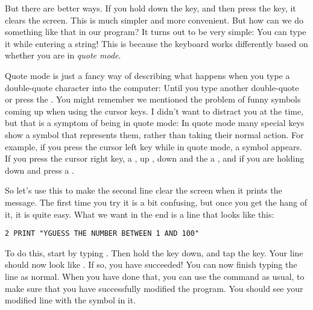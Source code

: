 But there are better ways.  If you hold down the 
key, and then press the  key, it clears the
screen.  This is much simpler and more convenient. But how can we do
something like that in our program?  It turns out to be very simple:
You can type it while entering a string!  This is because the keyboard
works differently based on whether you are in {\em quote
  mode}.

Quote mode is just a fancy way of
describing what happens when you type a double-quote character into
the computer: Until you type another double-quote or press the
.  You might remember we mentioned the problem of
funny symbols coming up when using the cursor keys.  I didn't want to
distract you at the time, but that is a symptom of being in quote mode:
In quote mode many special keys show a symbol that represents them,
rather than taking their normal action.  For example, if you press the
cursor left key while in quote mode, a  symbol appears. If you
press the cursor right key, a , up , down  and the
 a , and if you are holding down
 and press  a .

\needspace{3cm}
So let's use this to make the second line clear the screen when it
prints the  message.  The
first time you try it is a bit confusing, but once you get the hang of
it, it is quite easy.  What we want in the end is a line that looks
like this:

\begin{tcolorbox}[colback=black,coltext=white]
\verbatimfont{\codefont}
\begin{verbatim}
2 PRINT "ƳGUESS THE NUMBER BETWEEN 1 AND 100"
\end{verbatim}
\end{tcolorbox}

To do this, start by typing .  Then hold the
 key down, and tap the  key.
Your line should now look like .  If so, you have
succeeded! You can now finish typing the line as normal.  When you
have done that, you can use the  command as usual, to make
sure that you have successfully modified the program.   You should
see your modified line with the  symbol in it.

